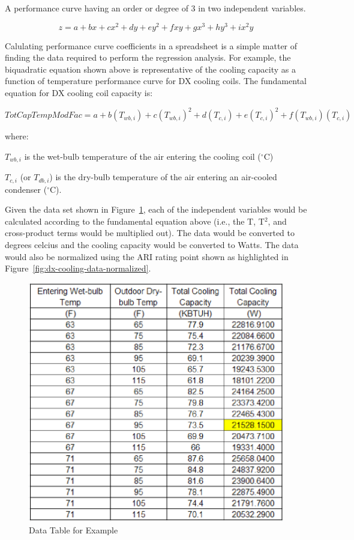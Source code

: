 A performance curve having an order or degree of 3 in two independent variables.

\begin{equation}
z = a + bx + c{x^2} + dy + e{y^2} + fxy + g{x^3} + h{y^3} + i{x^2}y
\end{equation}

Calulating performance curve coefficients in a spreadsheet is a simple matter of finding the data required to perform the regression analysis. For example, the biquadratic equation shown above is representative of the cooling capacity as a function of temperature performance curve for DX cooling coils. The fundamental equation for DX cooling coil capacity is:

\begin{equation}
TotCapTempModFac = a + b\left( {{T_{wb,i}}} \right) + c{\left( {{T_{wb,i}}} \right)^2} + d\left( {{T_{c,i}}} \right) + e{\left( {{T_{c,i}}} \right)^2} + f\left( {{T_{wb,i}}} \right)\left( {{T_{c,i}}} \right)
\end{equation}

where:

\(T_{wb,i}\) is the wet-bulb temperature of the air entering the cooling coil (\(^{\circ}\)C)

\(T_{c,i}\) (or \(T_{db,i}\)) is the dry-bulb temperature of the air entering an air-cooled condenser (\(^{\circ}\)C).

Given the data set shown in Figure~\ref{fig:dx-cooling-data-table}, each of the independent variables would be calculated according to the fundamental equation above (i.e., the T, T\(^{2}\), and cross-product terms would be multiplied out). The data would be converted to degrees celcius and the cooling capacity would be converted to Watts. The data would also be normalized using the ARI rating point shown as highlighted in Figure~\ref{fig:dx-cooling-data-normalized}.

\begin{figure}[htbp]
\centering
\includegraphics{media/image7865.png}
\caption{Data Table for Example \protect \label{fig:dx-cooling-data-table}}
\end{figure}

